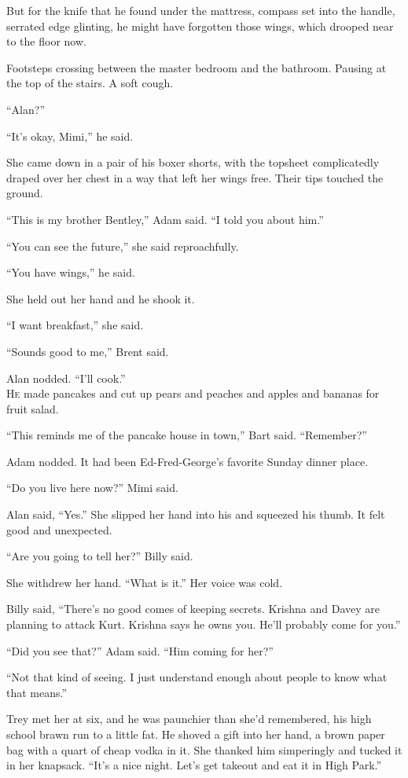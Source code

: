 But for the knife that he found under the mattress, compass set into
the handle, serrated edge glinting, he might have forgotten those
wings, which drooped near to the floor now. 

Footsteps crossing between the master bedroom and the bathroom. 
Pausing at the top of the stairs.  A soft cough.

``Alan?''

``It's okay, Mimi,'' he said. 

She came down in a pair of his boxer shorts, with the topsheet
complicatedly draped over her chest in a way that left her wings free. 
Their tips touched the ground.

``This is my brother Bentley,'' Adam said.  ``I told you about him.''

``You can see the future,'' she said reproachfully.

``You have wings,'' he said.

She held out her hand and he shook it.

``I want breakfast,'' she said. 

``Sounds good to me,'' Brent said. 

Alan nodded.  ``I'll cook.''
\\
\lettrine[lines=3, lhang=.5, nindent=0pt, findent=2pt]{H}{e} made pancakes and cut up pears and peaches and apples and bananas
for fruit salad. 

``This reminds me of the pancake house in town,'' Bart said. 
``Remember?''

Adam nodded.  It had been Ed-Fred-George's favorite Sunday dinner
place.

``Do you live here now?'' Mimi said.

Alan said, ``Yes.'' She slipped her hand into his and squeezed his
thumb.  It felt good and unexpected.

``Are you going to tell her?'' Billy said. 

She withdrew her hand.  ``What is it.'' Her voice was cold.

Billy said, ``There's no good comes of keeping secrets.  Krishna and
Davey are planning to attack Kurt.  Krishna says he owns you.  He'll
probably come for you.''

``Did you see that?'' Adam said.  ``Him coming for her?''

``Not that kind of seeing.  I just understand enough about people to
know what that means.''

Trey met her at six, and he was paunchier than she'd remembered, his
high school brawn run to a little fat.  He shoved a gift into her
hand, a brown paper bag with a quart of cheap vodka in it.  She
thanked him simperingly and tucked it in her knapsack.  ``It's a nice
night.  Let's get takeout and eat it in High Park.''

